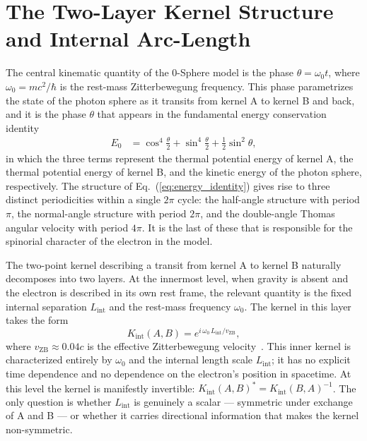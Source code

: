 \documentclass[%
 reprint,
 amsmath,amssymb,
 aps,
 prb,
]{revtex4-2}
\numberwithin{equation}{section}
\newcommand{\iphase}{\theta}  %
\newcommand{\Lint}{L_{\text{int}}}
\newcommand{\vZB}{v_{\text{ZB}}}
\begin{document}
\section{The Two-Layer Kernel Structure and Internal Arc-Length}
\label{sec:kernel}

The central kinematic quantity of the 0-Sphere model is the phase $\iphase = \omega_0 t$, where $\omega_0 = mc^2/\hbar$ is the rest-mass Zitterbewegung frequency. This phase parametrizes the state of the photon sphere as it transits from kernel A to kernel B and back, and it is the phase $\iphase$ that appears in the fundamental energy conservation identity~\cite{paper38}
\begin{align}
E_0 &= \cos^4\!\tfrac{\iphase}{2} + \sin^4\!\tfrac{\iphase}{2} + \tfrac{1}{2}\sin^2\!\iphase,
\label{eq:energy_identity}
\end{align}
in which the three terms represent the thermal potential energy of kernel A, the thermal potential energy of kernel B, and the kinetic energy of the photon sphere, respectively. The structure of Eq.~(\ref{eq:energy_identity}) gives rise to three distinct periodicities within a single $2\pi$ cycle: the half-angle structure with period $\pi$, the normal-angle structure with period $2\pi$, and the double-angle Thomas angular velocity with period $4\pi$. It is the last of these that is responsible for the spinorial character of the electron in the model.

The two-point kernel describing a transit from kernel A to kernel B naturally decomposes into two layers. At the innermost level, when gravity is absent and the electron is described in its own rest frame, the relevant quantity is the fixed internal separation $\Lint$ and the rest-mass frequency $\omega_0$. The kernel in this layer takes the form
\begin{equation}
K_{\text{int}}(A,B) = e^{i\,\omega_0\,\Lint/\vZB},
\label{eq:kernel_int}
\end{equation}
where $\vZB \approx 0.04c$ is the effective Zitterbewegung velocity~\cite{paper35}. This inner kernel is characterized entirely by $\omega_0$ and the internal length scale $\Lint$; it has no explicit time dependence and no dependence on the electron's position in spacetime. At this level the kernel is manifestly invertible: $K_{\text{int}}(A,B)^* = K_{\text{int}}(B,A)^{-1}$. The only question is whether $\Lint$ is genuinely a scalar --- symmetric under exchange of A and B --- or whether it carries directional information that makes the kernel non-symmetric.
\end{document}
